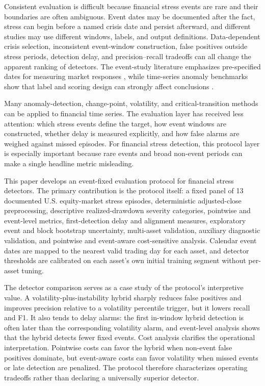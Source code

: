 \documentclass[pdflatex,sn-mathphys-num]{sn-jnl}
\begin{document}
Consistent evaluation is difficult because financial stress events are rare and their boundaries are often ambiguous. Event dates may be documented after the fact, stress can begin before a named crisis date and persist afterward, and different studies may use different windows, labels, and output definitions. Data-dependent crisis selection, inconsistent event-window construction, false positives outside stress periods, detection delay, and precision--recall tradeoffs can all change the apparent ranking of detectors. The event-study literature emphasizes pre-specified dates for measuring market responses \cite{brown1985,mackinlay1997}, while time-series anomaly benchmarks show that label and scoring design can strongly affect conclusions \cite{lavin2015,wu2022}.

Many anomaly-detection, change-point, volatility, and critical-transition methods can be applied to financial time series. The evaluation layer has received less attention: which stress events define the target, how event windows are constructed, whether delay is measured explicitly, and how false alarms are weighed against missed episodes. For financial stress detection, this protocol layer is especially important because rare events and broad non-event periods can make a single headline metric misleading.

This paper develops an event-fixed evaluation protocol for financial stress detectors. The primary contribution is the protocol itself: a fixed panel of 13 documented U.S. equity-market stress episodes, deterministic adjusted-close preprocessing, descriptive realized-drawdown severity categories, pointwise and event-level metrics, first-detection delay and alignment measures, exploratory event and block bootstrap uncertainty, multi-asset validation, auxiliary diagnostic validation, and pointwise and event-aware cost-sensitive analysis. Calendar event dates are mapped to the nearest valid trading day for each asset, and detector thresholds are calibrated on each asset's own initial training segment without per-asset tuning.

The detector comparison serves as a case study of the protocol's interpretive value. A volatility-plus-instability hybrid sharply reduces false positives and improves precision relative to a volatility percentile trigger, but it lowers recall and F1. It also tends to delay alarms: the first in-window hybrid detection is often later than the corresponding volatility alarm, and event-level analysis shows that the hybrid detects fewer fixed events. Cost analysis clarifies the operational interpretation. Pointwise costs can favor the hybrid when non-event false positives dominate, but event-aware costs can favor volatility when missed events or late detection are penalized. The protocol therefore characterizes operating tradeoffs rather than declaring a universally superior detector.
\end{document}
